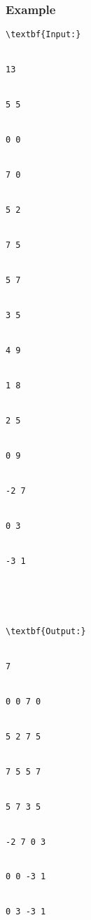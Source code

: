 \subsubsection{   Example  }
\begin{verbatim}
\textbf{Input:}


13


5 5


0 0


7 0


5 2


7 5


5 7


3 5


4 9


1 8


2 5


0 9


-2 7


0 3


-3 1





\textbf{Output:}


7


0 0 7 0


5 2 7 5


7 5 5 7


5 7 3 5


-2 7 0 3


0 0 -3 1


0 3 -3 1


\end{verbatim}
